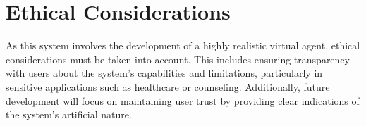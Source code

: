 \documentclass[12pt]{article}
\begin{document}







\section{Ethical Considerations}

As this system involves the development of a highly realistic virtual agent, ethical considerations must be taken into account. This includes ensuring transparency with users about the system's capabilities and limitations, particularly in sensitive applications such as healthcare or counseling. Additionally, future development will focus on maintaining user trust by providing clear indications of the system's artificial nature.



\end{document}
